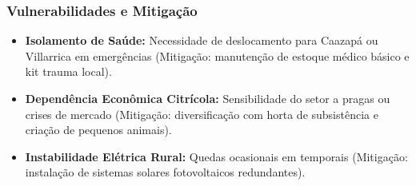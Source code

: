 \subsubsection{Vulnerabilidades e
Mitigação}

\begin{itemize}
\tightlist
\item
  \textbf{Isolamento de Saúde:} Necessidade de deslocamento para Caazapá
  ou Villarrica em emergências (Mitigação: manutenção de estoque médico
  básico e kit trauma local).
\item
  \textbf{Dependência Econômica Citrícola:} Sensibilidade do setor a
  pragas ou crises de mercado (Mitigação: diversificação com horta de
  subsistência e criação de pequenos animais).
\item
  \textbf{Instabilidade Elétrica Rural:} Quedas ocasionais em temporais
  (Mitigação: instalação de sistemas solares fotovoltaicos redundantes).
\end{itemize}

